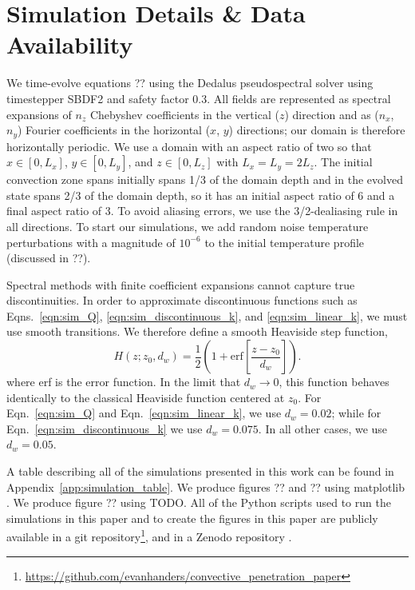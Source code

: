\section{Simulation Details \& Data Availability}
\label{app:simulation_details}
We time-evolve equations ?? using the Dedalus pseudospectral solver \citep{burns_etal_2020} using timestepper SBDF2 \citep{wang_ruuth_2020} and safety factor 0.3.
All fields are represented as spectral expansions of $n_z$ Chebyshev coefficients in the vertical ($z$) direction and as ($n_x$, $n_y$) Fourier coefficients in the horizontal ($x$, $y$) directions; our domain is therefore horizontally periodic.
We use a domain with an aspect ratio of two so that $x \in [0, L_x]$, $y \in [0, L_y]$, and $z \in [0, L_z]$ with $L_x = L_y = 2L_z$.
The initial convection zone spans initially spans 1/3 of the domain depth and in the evolved state spans 2/3 of the domain depth, so it has an initial aspect ratio of 6 and a final aspect ratio of 3.
To avoid aliasing errors, we use the 3/2-dealiasing rule in all directions.
To start our simulations, we add random noise temperature perturbations with a magnitude of $10^{-6}$ to the initial temperature profile (discussed in ??).

Spectral methods with finite coefficient expansions cannot capture true discontinuities.
In order to approximate discontinuous functions such as Eqns.~\ref{eqn:sim_Q}, \ref{eqn:sim_discontinuous_k}, and \ref{eqn:sim_linear_k}, we must use smooth transitions.
We therefore define a smooth Heaviside step function,
\begin{equation}
H(z; z_0, d_w) = \frac{1}{2}\left(1 + \mathrm{erf}\left[\frac{z - z_0}{d_w}\right]\right).
\label{eqn:heaviside}
\end{equation}
where erf is the error function.
In the limit that $d_w \rightarrow 0$, this function behaves identically to the classical Heaviside function centered at $z_0$.
For Eqn.~\ref{eqn:sim_Q} and Eqn.~\ref{eqn:sim_linear_k}, we use $d_w = 0.02$; while for Eqn.~\ref{eqn:sim_discontinuous_k} we use $d_w = 0.075$.
In all other cases, we use $d_w = 0.05$.

A table describing all of the simulations presented in this work can be found in Appendix~\ref{app:simulation_table}.
We produce figures ?? and ?? using matplotlib \citep{hunter2007, mpl3.3.4}.
We produce figure ?? using TODO.
All of the Python scripts used to run the simulations in this paper and to create the figures in this paper are publicly available in a git repository\footnote{\url{https://github.com/evanhanders/convective_penetration_paper}}, and in a Zenodo repository \citep{supp}.
